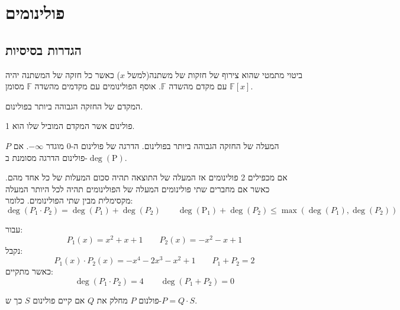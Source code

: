 \documentclass{tstextbook}
\begin{document}
\section{פולינומים}

\subsection{הגדרות בסיסיות}

\begin{definition}[פולינום]
ביטוי מתמטי שהוא צירוף של חזקות של משתנה(למשל \(x\)) כאשר כל חזקה של המשתנה יהיה עם מקדם מהשדה \(\mathbb{F}\). אוסף הפולינומים עם מקדמים מהשדה \(\mathbb{F}\) מסומן \(\mathbb{F} [x]\).

\end{definition}
\begin{definition}
המקדם של החזקה הגבוהה ביותר בפולינום.

\end{definition}
\begin{definition}
פולינום אשר המקדם המוביל שלו הוא 1. 

\end{definition}
\begin{definition}
המעלה של החזקה הגבוהה ביותר בפולינום. הדרגה של פולינום ה-0 מוגדר \(-\infty\). אם \(P\) פולינום הדרגה מסומנת ב-\(\mathrm{\deg(P)}\).

\end{definition}
\begin{proposition}
אם מכפילים 2 פולינומים אז המעלה של התוצאה תהיה סכום המעלות של כל אחד מהם. כאשר אם מחברים שתי פולינומים המעלה של הפולינומים תהיה לכל היותר המעלה מקסימלית מבין שתי הפולינומים. כלומר:
$$\deg\left( P_{1}\cdot P_{2} \right)=\deg(P_{1}) +\deg(P_{2}) \qquad \mathrm{\deg(P_{1}) }+\deg(P_{2}) \leq \max \left( \deg(P_{1}) ,\deg(P_{2})  \right)  $$

\end{proposition}
\begin{example}
עבור:
$$P_{1}(x)=x^{2}+x+1\qquad P_{2}(x)=-x^2-x+1$$
נקבל:
$$P_{1}(x)\cdot P_{2}(x)=- x^{4} - 2 x^{3} - x^{2} + 1 \qquad P_{1}+P_{2}=2$$
כאשר מתקיים:
$${\deg\left( P_{1}\cdot P_{2} \right) }=4\qquad \deg(P_{1}+P_{2})=0 $$

\end{example}
\begin{definition}[חלוקה]
פולנום \(P\) מחלק את \(Q\) אם קיים פולינום \(S\) כך ש-\(P=Q\cdot S\). 

\end{definition}
\end{document}
